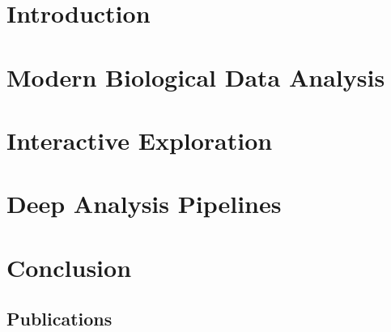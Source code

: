 \documentclass[USenglish,phd]{uit-thesis}
\begin{document}
 
 

\tableofcontents

\printglossary[type=\acronymtype]

\mainmatter

\chapter{Introduction}
 

\chapter{Modern Biological Data Analysis}


\chapter{Interactive Exploration}  


\chapter{Deep Analysis Pipelines}  


\chapter{Conclusion}
 

\appendix
\begin{appendix}
    \chapter{Publications}
\end{appendix}

\backmatter



\end{document}

